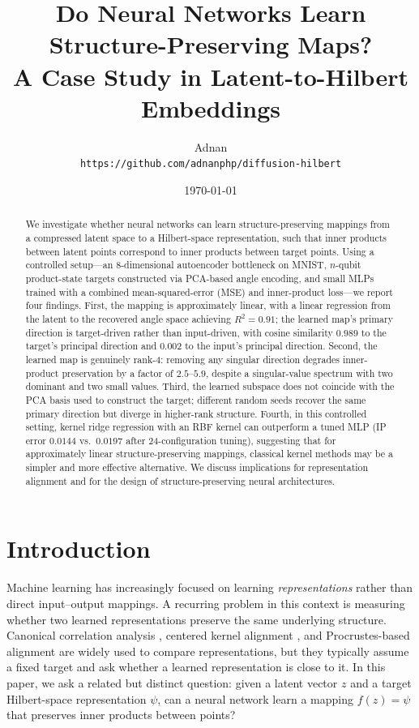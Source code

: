 \documentclass[11pt]{article}
\title{Do Neural Networks Learn Structure-Preserving Maps?\\
       A Case Study in Latent-to-Hilbert Embeddings}
\author{Adnan \\
        \texttt{https://github.com/adnanphp/diffusion-hilbert}}
\date{\today}
\begin{document}
\maketitle

\begin{abstract}
We investigate whether neural networks can learn structure-preserving
mappings from a compressed latent space to a Hilbert-space representation,
such that inner products between latent points correspond to inner products
between target points. Using a controlled setup---an 8-dimensional
autoencoder bottleneck on MNIST, $n$-qubit product-state targets constructed
via PCA-based angle encoding, and small MLPs trained with a combined
mean-squared-error (MSE) and inner-product loss---we report four findings.
First, the mapping is approximately linear, with a linear regression from
the latent to the recovered angle space achieving $R^{2} = 0.91$; the
learned map's primary direction is target-driven rather than input-driven,
with cosine similarity $0.989$ to the target's principal direction and
$0.002$ to the input's principal direction. Second, the learned map is
genuinely rank-4: removing any singular direction degrades inner-product
preservation by a factor of $2.5$--$5.9$, despite a singular-value spectrum
with two dominant and two small values. Third, the learned subspace does
not coincide with the PCA basis used to construct the target; different
random seeds recover the same primary direction but diverge in higher-rank
structure. Fourth, in this controlled setting, kernel ridge regression with
an RBF kernel can outperform a tuned MLP (IP error $0.0144$ vs.\ $0.0197$
after 24-configuration tuning), suggesting that for approximately linear
structure-preserving mappings, classical kernel methods may be a simpler
and more effective alternative. We discuss implications for representation
alignment and for the design of structure-preserving neural architectures.
\end{abstract}

\section{Introduction}

Machine learning has increasingly focused on learning \emph{representations}
rather than direct input--output mappings. A recurring problem in this
context is measuring whether two learned representations preserve the same
underlying structure. Canonical correlation analysis \cite{raghu2017svcca},
centered kernel alignment \cite{kornblith2019similarity}, and
Procrustes-based alignment \cite{gower1975generalized} are widely used to
compare representations, but they typically assume a fixed target and ask
whether a learned representation is close to it. In this paper, we ask a
related but distinct question: given a latent vector $z$ and a target
Hilbert-space representation $\psi$, can a neural network learn a mapping
$f(z) = \psi$ that preserves inner products between points?
\end{document}
